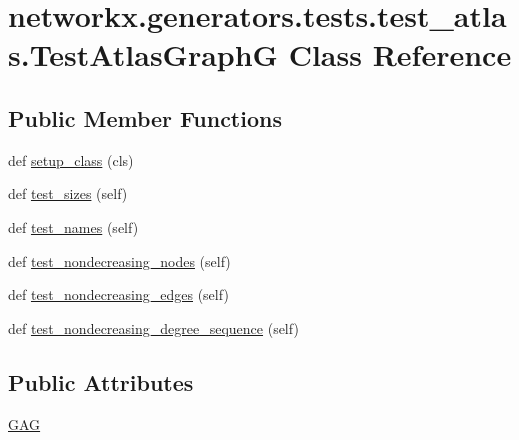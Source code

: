 \hypertarget{classnetworkx_1_1generators_1_1tests_1_1test__atlas_1_1TestAtlasGraphG}{}\section{networkx.\+generators.\+tests.\+test\+\_\+atlas.\+Test\+Atlas\+GraphG Class Reference}
\label{classnetworkx_1_1generators_1_1tests_1_1test__atlas_1_1TestAtlasGraphG}
\subsection*{Public Member Functions}
\begin{DoxyCompactItemize}
\item 
def \hyperlink{classnetworkx_1_1generators_1_1tests_1_1test__atlas_1_1TestAtlasGraphG_a24513c09d441d8052a7c66c1ea61d1a0}{setup\+\_\+class} (cls)
\item 
def \hyperlink{classnetworkx_1_1generators_1_1tests_1_1test__atlas_1_1TestAtlasGraphG_a5e79b9262796cbf7ce87f58db8c99c31}{test\+\_\+sizes} (self)
\item 
def \hyperlink{classnetworkx_1_1generators_1_1tests_1_1test__atlas_1_1TestAtlasGraphG_a39d067f6990d9772a97e8b04db092d83}{test\+\_\+names} (self)
\item 
def \hyperlink{classnetworkx_1_1generators_1_1tests_1_1test__atlas_1_1TestAtlasGraphG_afa182efc79682413209a72d0ead1af34}{test\+\_\+nondecreasing\+\_\+nodes} (self)
\item 
def \hyperlink{classnetworkx_1_1generators_1_1tests_1_1test__atlas_1_1TestAtlasGraphG_a136ec19bb10b9896580da2d725ec5355}{test\+\_\+nondecreasing\+\_\+edges} (self)
\item 
def \hyperlink{classnetworkx_1_1generators_1_1tests_1_1test__atlas_1_1TestAtlasGraphG_ae8d392bdffb4adbc5c248a9d105d49fb}{test\+\_\+nondecreasing\+\_\+degree\+\_\+sequence} (self)
\end{DoxyCompactItemize}
\subsection*{Public Attributes}
\begin{DoxyCompactItemize}
\item 
\hyperlink{classnetworkx_1_1generators_1_1tests_1_1test__atlas_1_1TestAtlasGraphG_adde16e7a701bd2e3bfa5f21e232fd1ab}{G\+AG}
\end{DoxyCompactItemize}


